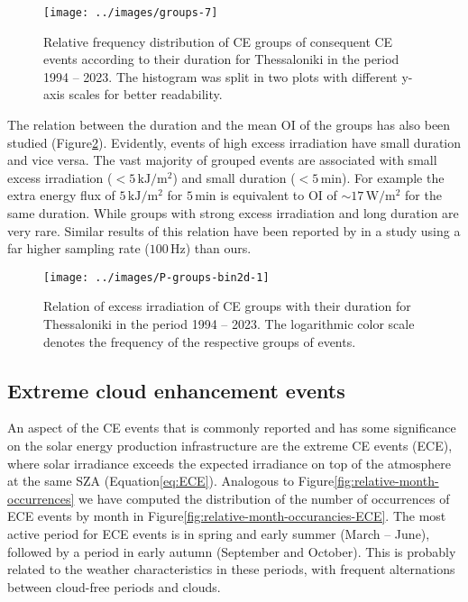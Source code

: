 \documentclass[preprint, 5p,
authoryear]{elsarticle} %
\begin{document}
\begin{figure}

{\centering \texttt{[image: ../images/groups-7]} 

}

\caption{Relative frequency distribution of CE groups of consequent CE events according to their duration for Thessaloniki in the period 1994 -- 2023. The histogram was split in two plots with different y-axis scales for better readability.}\label{fig:ceg-duration-distribution}
\end{figure}

The relation between the duration and the mean OI of the groups has also
been studied (Figure\nobreakspace{}\ref{fig:group-2d}). Evidently,
events of high excess irradiation have small duration and vice versa.
The vast majority of grouped events are associated with small excess
irradiation (\(<5\,\text{kJ}/\text{m}^2\)) and small duration
(\(<5\,\text{min}\)). For example the extra energy flux of
\(5\,\text{kJ}/\text{m}^2\) for \(5\,\text{min}\) is equivalent to OI of
\(\sim17\,\text{W}/\text{m}^2\) for the same duration. While groups with
strong excess irradiation and long duration are very rare. Similar
results of this relation have been reported by \citet{Zhang2018} in a
study using a far higher sampling rate (\(100\,\text{Hz}\)) than ours.

\begin{figure}

{\centering \texttt{[image: ../images/P-groups-bin2d-1]} 

}

\caption{Relation of excess irradiation of CE groups with their duration for Thessaloniki in the period 1994 -- 2023. The logarithmic color scale denotes the frequency of the respective groups of events.}\label{fig:group-2d}
\end{figure}

\hypertarget{extreme-cloud-enhancement-events}{%
\subsection{Extreme cloud enhancement
events}\label{extreme-cloud-enhancement-events}}

An aspect of the CE events that is commonly reported and has some
significance on the solar energy production infrastructure are the
extreme CE events (ECE), where solar irradiance exceeds the expected
irradiance on top of the atmosphere at the same SZA
(Equation\nobreakspace{}\ref{eq:ECE}). Analogous to
Figure\nobreakspace{}\ref{fig:relative-month-occurrences} we have
computed the distribution of the number of occurrences of ECE events by
month in Figure\nobreakspace{}\ref{fig:relative-month-occurancies-ECE}.
The most active period for ECE events is in spring and early summer
(March -- June), followed by a period in early autumn (September and
October). This is probably related to the weather characteristics in
these periods, with frequent alternations between cloud-free periods and
clouds.
\end{document}
